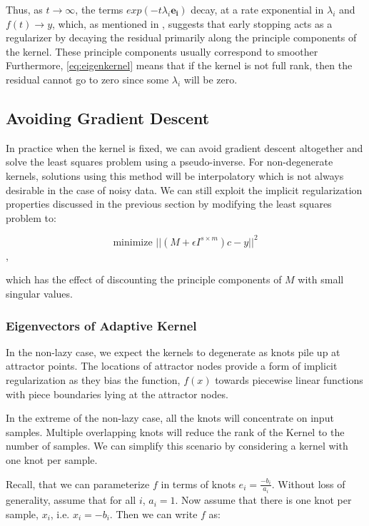 Thus, as $t \rightarrow \infty$, the terms $exp(-t \lambda_i\mathbf{e_i})$ decay, at a rate exponential in $\lambda_i$ and $f(t) \rightarrow y$, which, as mentioned in \cite{NTKJacot}, suggests that early stopping acts as a regularizer by decaying the residual primarily along the principle components of the kernel. These principle components usually correspond to smoother  Furthermore, \eqref{eq:eigenkernel} means that if the kernel is not full rank, then the residual cannot go to zero since some $\lambda_i$ will be zero.

\subsection{Avoiding Gradient Descent}

In practice when the kernel is fixed, we can avoid gradient descent altogether and solve the least squares problem using a pseudo-inverse. For non-degenerate kernels, solutions using this method will be interpolatory which is not always desirable in the case of noisy data. We can still exploit the implicit regularization properties discussed in the previous section by modifying the least squares problem to:

\begin{equation}
    \text{minimize } ||(M + \epsilon I^{s \times m})c - y||^2
\end{equation},

which has the effect of discounting the principle components of $M$ with small singular values.

\subsubsection{Eigenvectors of Adaptive Kernel}
In the non-lazy case, we expect the kernels to degenerate as knots pile up at attractor points. The locations of attractor nodes provide a form of implicit regularization as they bias the function, $f(x)$ towards piecewise linear functions with piece boundaries lying at the attractor nodes.

In the extreme of the non-lazy case, all the knots will concentrate on input samples. Multiple overlapping knots will reduce the rank of the Kernel to the number of samples. We can simplify this scenario by considering a kernel with one knot per sample.

Recall, that we can parameterize $f$ in terms of knots $e_i = \frac{-b_i}{a_i}$. Without loss of generality, assume that for all $i$, $a_i = 1$. Now assume that there is one knot per sample, $x_i$, i.e. $x_i = -b_i$. Then we can write $f$ as:

